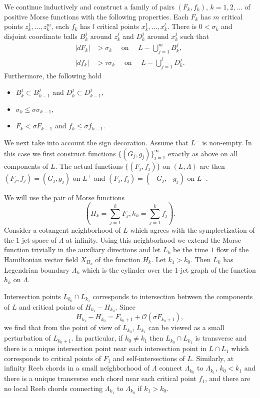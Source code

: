 \documentclass{gtpart}
\begin{document}
We continue inductively and construct a family of pairs $(F_k,f_k)$, $k=1,2,\dots$ of positive Morse
functions with the following properties. Each $F_k$ has $m$ critical points $z_{k}^{1},\dots, z_k^{m}$, each $f_k$ has $l$ critical points $x_{k}^{1},\dots,x_{k}^{l}$. There is $0<\sigma_k$ and disjoint coordinate balls $B_{k}^{j}$ around $z_{k}^{j}$ and $D_{k}^{j}$ around $x_{k}^{j}$ such that 
\begin{align*}
|dF_k|&>\sigma_{k}\quad\text{ on }\quad L-\bigcup_{j=1}^{m}B^{j}_{k},\\
|df_k|&>\tau\sigma_{k}\quad\text{ on }\quad L-\bigcup_{j=1}^{l}D^{j}_{k}.
\end{align*}
Furthermore, the following hold
\begin{itemize}
	\item $B^{j}_{k}\subset B^{j}_{k-1}$ and $D^{j}_{k}\subset D^{j}_{k-1}$,
	\item $\sigma_k\le \sigma\sigma_{k-1}$,
	\item $F_{k}< \sigma F_{k-1}$ and $f_k\le \sigma f_{k-1}$.
\end{itemize}

We next take into account the sign decoration. Assume that $L^{-}$ is non-empty. In this case we
first construct functions $\{(G_{j},g_{j})\}_{j=1}^{\infty}$ exactly as above on all components of
$L$. The actual functions $\{(F_{j},f_{j})\}$ on $(L,\Lambda)$ are then
$(F_{j},f_{j})=(G_{j},g_{j})$ on $L^{+}$ and $(F_{j},f_{j})=(-G_{j},-g_{j})$ on $L^{-}$.


We will use the pair of Morse functions
\[
\left(H_k= \sum_{j=1}^{k} F_j, h_k= \sum_{j=1}^{k} f_j\right).
\]
Consider a cotangent neighborhood of $L$ which agrees with the symplectization of the $1$-jet space of $\Lambda$ at infinity. Using this neighborhood we extend the Morse function trivially in the auxiliary directions and let $L_{k}$ be the time $1$ flow of the Hamiltonian vector field $X_{H_{k}}$ of the function $H_k$. Let $k_1>k_{0}$. Then $L_k$ has Legendrian boundary $\Lambda_{k}$ which is the cylinder over the 1-jet graph of the function $h_{k}$ on $\Lambda$.

Intersection points  $L_{k_0}\cap L_{k_1}$ corresponds to intersection between the components of $L$ and critical points of $H_{k_1}-H_{k_0}$. Since
\[ 
H_{k_1}-H_{k_0}=F_{k_{0}+1}+\mathcal{O}(\sigma F_{k_0+1}), 
\]
we find that from the point of view of $L_{k_0}$, $L_{k_1}$ can be viewed as a small perturbation of $L_{k_0+1}$. In particular, if $k_0\ne k_1$ then $L_{k_0}\cap L_{k_1}$ is transverse and there is a unique intersection point near each intersection point in $L\cap L_{1}$ which corresponds to critical points of $F_1$ and self-intersections of $L$. Similarly, at infinity Reeb chords in a small neighborhood of $\Lambda$ connect $\Lambda_{k_0}$ to $\Lambda_{k_1}$,  $k_0<k_1$ and there is a unique transverse such chord near each critical point $f_{1}$, and there are no local Reeb chords connecting $\Lambda_{k_{1}}$ to $\Lambda_{k_{0}}$ if $k_1>k_0$.  
\end{document}
